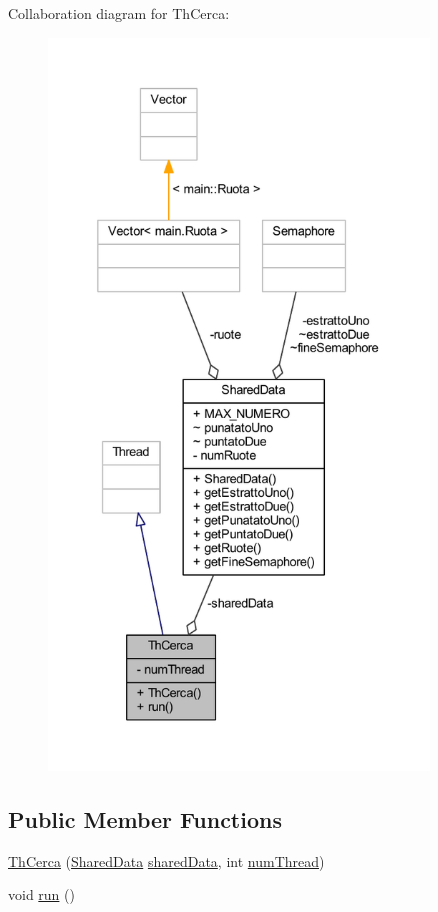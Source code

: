 Collaboration diagram for Th\+Cerca\+:
\nopagebreak
\begin{figure}[H]
\begin{center}
\leavevmode
\includegraphics[height=550pt]{classmain_1_1_th_cerca__coll__graph}
\end{center}
\end{figure}
\subsection*{Public Member Functions}
\begin{DoxyCompactItemize}
\item 
\mbox{\hyperlink{classmain_1_1_th_cerca_a0a83c1da759198486023f64ed17596ca}{Th\+Cerca}} (\mbox{\hyperlink{classmain_1_1_shared_data}{Shared\+Data}} \mbox{\hyperlink{classmain_1_1_th_cerca_ac5f1128ef8d0ba91a8214e03732e2662}{shared\+Data}}, int \mbox{\hyperlink{classmain_1_1_th_cerca_a647182b81f9dc0ef69645f81af0b6a73}{num\+Thread}})
\item 
void \mbox{\hyperlink{classmain_1_1_th_cerca_a13a43e6d814de94978c515cb084873b1}{run}} ()
\end{DoxyCompactItemize}
